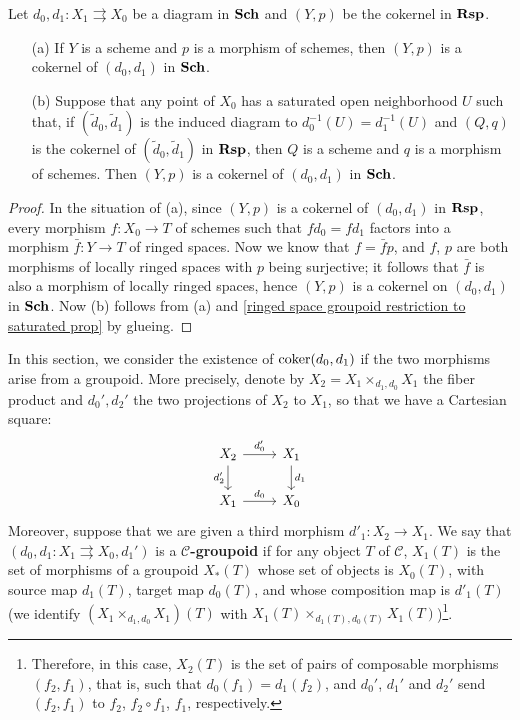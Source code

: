 \begin{lemma}\label{ringed space groupoid cokernel in scheme if}
Let $d_0,d_1:X_1\rightrightarrows X_0$ be a diagram in $\mathbf{Sch}$ and $(Y,p)$ be the cokernel in $\mathbf{Rsp}$.
\begin{enumerate}
    \item[(a)] If $Y$ is a scheme and $p$ is a morphism of schemes, then $(Y,p)$ is a cokernel of $(d_0,d_1)$ in $\mathbf{Sch}$.
    \item[(b)] Suppose that any point of $X_0$ has a saturated open neighborhood $U$ such that, if $(\tilde{d}_0,\tilde{d}_1)$ is the induced diagram to $d_0^{-1}(U)=d_1^{-1}(U)$ and $(Q,q)$ is the cokernel of $(\tilde{d}_0,\tilde{d}_1)$ in $\mathbf{Rsp}$, then $Q$ is a scheme and $q$ is a morphism of schemes. Then $(Y,p)$ is a cokernel of $(d_0,d_1)$ in $\mathbf{Sch}$.
\end{enumerate}
\end{lemma}
\begin{proof}
In the situation of (a), since $(Y,p)$ is a cokernel of $(d_0,d_1)$ in $\mathbf{Rsp}$, every morphism $f:X_0\to T$ of schemes such that $fd_0=fd_1$ factors into a morphism $\bar{f}:Y\to T$ of ringed spaces. Now we know that $f=\bar{f}p$, and $f$, $p$ are both morphisms of locally ringed spaces with $p$ being surjective; it follows that $\bar{f}$ is also a morphism of locally ringed spaces, hence $(Y,p)$ is a cokernel on $(d_0,d_1)$ in $\mathbf{Sch}$. Now (b) follows from (a) and \cref{ringed space groupoid restriction to saturated prop} by glueing.
\end{proof}

In this section, we consider the existence of $\operatorname{coker}(d_0,d_1)$ if the two morphisms arise from a groupoid. More precisely, denote by $X_2=X_1\times_{d_1,d_0}X_1$ the fiber product and $d_0',d_2'$ the two projections of $X_2$ to $X_1$, so that we have a Cartesian square:
\begin{equation}\label{category groupoid square-1}
\begin{tikzcd}
X_2\ar[r,"d_0'"]\ar[d,swap,"d_2'"]&X_1\ar[d,"d_1"]\\
X_1\ar[r,"d_0"]&X_0
\end{tikzcd}
\end{equation}
Moreover, suppose that we are given a third morphism $d'_1:X_2\to X_1$. We say that $(d_0,d_1:X_1\rightrightarrows X_0,d_1')$ is a \textbf{$\mathcal{C}$-groupoid} if for any object $T$ of $\mathcal{C}$, $X_1(T)$ is the set of morphisms of a groupoid $X_*(T)$ whose set of objects is $X_0(T)$, with source map $d_1(T)$, target map $d_0(T)$, and whose composition map is $d'_1(T)$ (we identify $(X_1\times_{d_1,d_0}X_1)(T)$ with $X_1(T)\times_{d_1(T),d_0(T)}X_1(T)$)\footnote{Therefore, in this case, $X_2(T)$ is the set of pairs of composable morphisms $(f_2,f_1)$, that is, such that $d_0(f_1)=d_1(f_2)$, and $d_0'$, $d_1'$ and $d_2'$ send $(f_2,f_1)$ to $f_2$, $f_2\circ f_1$, $f_1$, respectively.}.\par

